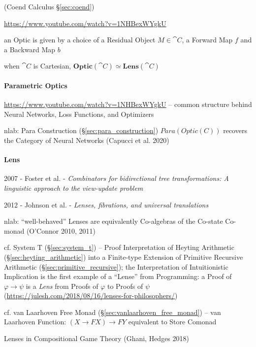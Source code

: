 (Coend Calculus \S\ref{sec:coend})

\asterism

\url{https://www.youtube.com/watch?v=1NHBexWYgkU}

an Optic is given by a choice of a Residual Object $M \in \cat{C}$, a Forward
Map $f$ and a Backward Map $b$

when $\cat{C}$ is Cartesian,
$\mathbf{Optic}(\cat{C}) \simeq \mathbf{Lens}(\cat{C})$



\paragraph{Parametric Optics}\label{sec:parametric_optics}\hfill

\url{https://www.youtube.com/watch?v=1NHBexWYgkU} -- common structure behind
Neural Networks, Loss Functions, and Optimizers

nlab: Para Construction (\S\ref{sec:para_construction}) $Para(Optic(C))$
recovers the Category of Neural Networks (Capucci et al. 2020)



\paragraph{Lens}\label{sec:lens}\hfill

2007 - Foster et al. - \emph{Combinators for bidirectional tree transformations:
A linguistic approach to the view-update problem}

2012 - Johnson et al. - \emph{Lenses, fibrations, and universal translations}

nlab: ``well-behaved'' Lenses are equivalently Co-algebras of the Co-state
Co-monad (O'Connor 2010, 2011)

\fist cf. System T (\S\ref{sec:system_t}) -- Proof Interpretation of Heyting
Arithmetic (\S\ref{sec:heyting_arithmetic}) into a Finite-type Extension of
Primitive Recursive Arithmetic (\S\ref{sec:primitive_recursive}); the
Interpretation of Intuitionistic Implication is the first example of a ``Lense''
from Programming: a Proof of $\varphi \rightarrow \psi$ is a \emph{Lens} from
Proofs of $\varphi$ to Proofs of $\psi$
(\url{https://julesh.com/2018/08/16/lenses-for-philosophers/})

\fist cf. van Laarhoven Free Monad (\S\ref{sec:vanlaarhoven_free_monad}) -- van
Laarhoven Function: $(X \rightarrow F X) \rightarrow F Y$ equivalent to Store
Comonad

Lenses in Compositional Game Theory (Ghani, Hedges 2018)

